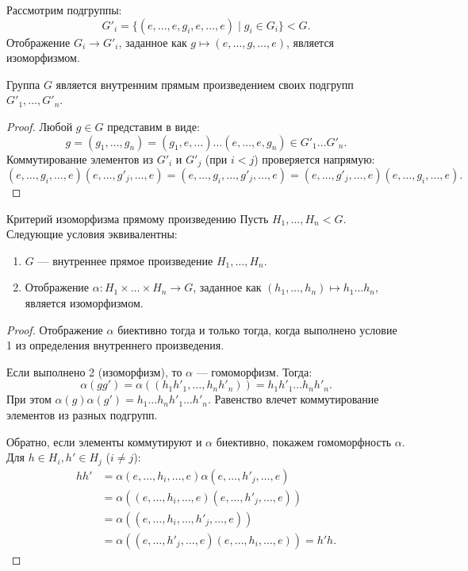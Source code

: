 Рассмотрим подгруппы:
\[
G'_i = \{ (e, \dots, e, g_i, e, \dots, e) \mid g_i \in G_i \} < G.
\]
Отображение $G_i \to G'_i$, заданное как $g \mapsto (e, \dots, g, \dots, e)$, является изоморфизмом.

\begin{Proposition}{}{}
	Группа $G$ является внутренним прямым произведением своих подгрупп $G'_1, \dots, G'_n$.
\end{Proposition}

\begin{proof}
	Любой $g \in G$ представим в виде:
	\[
	g = (g_1, \dots, g_n) = (g_1, e, \dots) \dots (e, \dots, e, g_n) \in G'_1 \dots G'_n.
	\]
	Коммутирование элементов из $G'_i$ и $G'_j$ (при $i < j$) проверяется напрямую:
	\[
	(e, \dots, g_i, \dots, e)(e, \dots, g'_j, \dots, e) = (e, \dots, g_i, \dots, g'_j, \dots, e) = (e, \dots, g'_j, \dots, e)(e, \dots, g_i, \dots, e).
	\]
\end{proof}

\begin{Proposition}{Критерий изоморфизма прямому произведению}{}
	Пусть $H_1, \dots, H_n < G$. Следующие условия эквивалентны:
	\begin{enumerate}
		\item $G$ --- внутреннее прямое произведение $H_1, \dots, H_n$.
		\item Отображение $\alpha \colon H_1 \times \dots \times H_n \to G$, заданное как $(h_1, \dots, h_n) \mapsto h_1 \dots h_n$, является изоморфизмом.
	\end{enumerate}
\end{Proposition}

\begin{proof}
	Отображение $\alpha$ биективно тогда и только тогда, когда выполнено условие 1 из определения внутреннего произведения.
	
	Если выполнено 2 (изоморфизм), то $\alpha$ --- гомоморфизм. Тогда:
	\[
	\alpha(gg') = \alpha((h_1 h'_1, \dots, h_n h'_n)) = h_1 h'_1 \dots h_n h'_n.
	\]
	При этом $\alpha(g)\alpha(g') = h_1 \dots h_n h'_1 \dots h'_n$. Равенство влечет коммутирование элементов из разных подгрупп.
	
	Обратно, если элементы коммутируют и $\alpha$ биективно, покажем гомоморфность $\alpha$. Для $h \in H_i, h' \in H_j$ ($i \neq j$):
	\begin{align*}
		hh' &= \alpha(e, \dots, h_i, \dots, e)\alpha(e, \dots, h'_j, \dots, e) \\
		&= \alpha((e, \dots, h_i, \dots, e)(e, \dots, h'_j, \dots, e)) \\
		&= \alpha((e, \dots, h_i, \dots, h'_j, \dots, e)) \\
		&= \alpha((e, \dots, h'_j, \dots, e)(e, \dots, h_i, \dots, e)) = h'h.
	\end{align*}
\end{proof}

